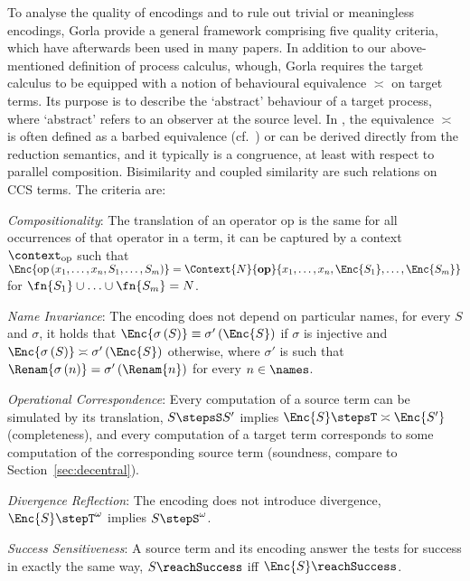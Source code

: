 \documentclass[copyright,creativecommons]{eptcs}
\begin{document}
To analyse the quality of encodings and to rule out trivial or meaningless encodings, Gorla \cite{gorla10} provide a general framework comprising five quality criteria, which have afterwards been used in many papers.
In addition to our above-mentioned definition of process calculus, whough, Gorla requires the target calculus to be equipped with a notion of behavioural equivalence $ \asymp $ on target terms. 
Its purpose is to describe the `abstract' behaviour of a target process, where `abstract' refers to an observer at the source level. 
In \cite{gorla10}, the equivalence $ \asymp $ is often defined as a barbed equivalence (cf.~\cite{milner.sangiorgi:barbed-bisimulation}) or can be derived directly from the reduction semantics, and it typically is a congruence, at least with respect to parallel composition. 
Bisimilarity and coupled similarity are such relations on CCS terms.
The criteria are:
\begin{compactenum}[(1)]
	\item \emph{Compositionality}: The translation of an operator $ \mathrm{op} $ is the same for all occurrences of that operator in a term, \ie it can be captured by a context $ \context_{\mathrm{op}} $ such that $ \Enc{\mathrm{op}\left( x_1, \ldots, x_n, S_1, \ldots, S_m \right)} = \Context{N}{\mathbf{op}}{x_1, \ldots, x_n, \Enc{S_1}, \ldots, \Enc{S_m}} $ for $ \fn{S_1} \cup \ldots \cup \fn{S_m} = N $.
	\item \emph{Name Invariance}: The encoding does not depend on particular names, \ie for every $ S $ and $ \sigma $, it holds that $ \Enc{\sigma\left( S \right)} \equiv \sigma'\left( \Enc{S} \right) $ if $ \sigma $ is injective and $ \Enc{\sigma\left( S \right)} \asymp \sigma'\left( \Enc{S} \right) $ otherwise, where $ \sigma' $ is such that $ \Renam{\sigma\left( n \right)} = \sigma'\left( \Renam{n} \right) $ for every $ n \in \names $.
	\item \emph{Operational Correspondence}: Every computation of a source term can be simulated by its translation, \ie $ S \stepsS S' $ implies $ \Enc{S} \stepsT \asymp \Enc{S'} $ (completeness), and every computation of a target term corresponds to some computation of the corresponding source term (soundness, compare to Section~\ref{sec:decentral}). 
	\item \emph{Divergence Reflection}: The encoding does not introduce divergence, \ie $ \Enc{S} \stepT^{\omega} $ implies $ S \stepS^{\omega} $.
	\item \emph{Success Sensitiveness}: A source term and its encoding answer the tests for success in exactly the same way, \ie $ S \reachSuccess $ iff $ \Enc{S} \reachSuccess $.
\end{compactenum}
\end{document}
